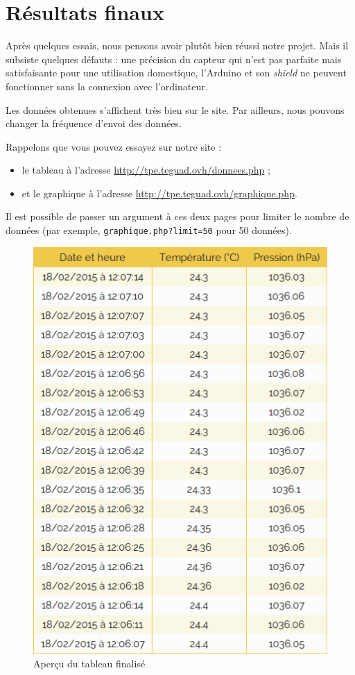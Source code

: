 \chapter{Résultats finaux}

Après quelques essais, nous pensons avoir plutôt bien réussi notre projet. Mais il subsiste quelques défauts : une précision du capteur qui n'est pas parfaite mais satisfaisante pour une utilisation domestique, l'Arduino et son \emph{shield} ne peuvent fonctionner sans la connexion avec l'ordinateur.

Les données obtenues s'affichent très bien sur le site. Par ailleurs, nous pouvons changer la fréquence d'envoi des données.

Rappelons que vous pouvez essayez sur notre site :
\begin{itemize}
	\item le tableau à l'adresse \url{http://tpe.teguad.ovh/donnees.php} ;
	\item et le graphique à l'adresse \url{http://tpe.teguad.ovh/graphique.php}.
\end{itemize}
Il est possible de passer un argument à ces deux pages pour limiter le nombre de données (par exemple, \verb-graphique.php?limit=50- pour 50 données).

\begin{figure}[!h]
	\centering
	\includegraphics[scale=.5]{Images/Tableau_final}
	\caption{Aperçu du tableau finalisé}
\end{figure}

